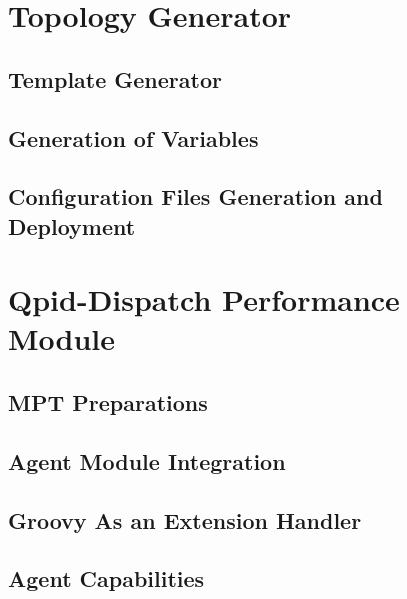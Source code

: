 \section{Topology Generator}

\subsection{Template Generator}

\subsection{Generation of Variables}

\subsection{Configuration Files Generation and Deployment}

\section{Qpid-Dispatch Performance Module}

\subsection{MPT Preparations}
\label{MPT Preparations}

\subsection{Agent Module Integration}

\subsection{Groovy As an Extension Handler} 

\subsection{Agent Capabilities}

